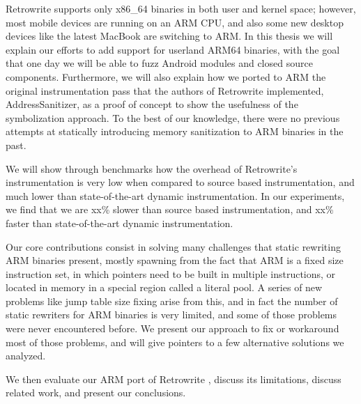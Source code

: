 \documentclass[a4paper,11pt,oneside]{report}
\begin{document}
Retrowrite supports only x86\_64 binaries in both user and kernel space; 
however, most mobile devices are running on an ARM CPU, and also some new 
desktop devices like the latest MacBook are switching to ARM. In this thesis we 
will explain our efforts to add support for userland ARM64 binaries, with the 
goal that one day we will be able to fuzz Android modules and closed source 
components. Furthermore, we will also explain how we ported to ARM the original 
instrumentation pass that the authors of Retrowrite implemented, 
AddressSanitizer, as a proof of concept to show the usefulness of the 
symbolization approach. To the best of our knowledge, there were no previous 
attempts at statically introducing memory sanitization to ARM binaries in the 
past. 

We will show through benchmarks how the overhead of Retrowrite's 
instrumentation is very low when compared to source based instrumentation, and 
much lower than state-of-the-art dynamic instrumentation. In our experiments, 
we find that we are xx\% slower than source based instrumentation, and xx\% 
faster than state-of-the-art dynamic instrumentation.

Our core contributions consist in solving many challenges that static rewriting 
ARM binaries present, mostly spawning from the fact that ARM is a fixed size 
instruction set, in which pointers need to be built in multiple instructions, 
or located in memory in a special region called a literal pool. A series of new 
problems like jump table size fixing arise from this, and in fact the number of 
static rewriters for ARM binaries is very limited, and some of those problems 
were never encountered before. We present our approach to fix or workaround 
most of those problems, and will give pointers to a few alternative solutions 
we analyzed.

We then evaluate our ARM port of Retrowrite , discuss its limitations, discuss 
related work, and present our conclusions.









\end{document}
